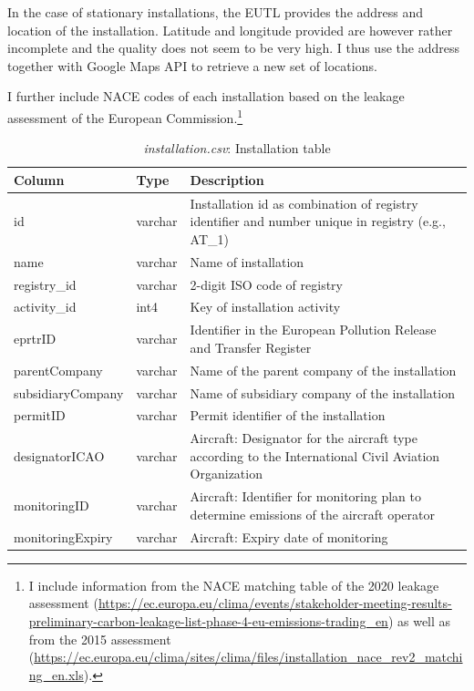 \documentclass[authoryear]{elsarticle}
\begin{document}
In the case of stationary installations, the EUTL provides the address and location of the installation. Latitude and longitude provided are however rather incomplete and the quality does not seem to be very high. I thus use the address together with Google Maps API to retrieve a new set of locations. 

I further include NACE codes of each installation based on the leakage assessment of the European Commission.\footnote{I include information from the NACE matching table of the 2020 leakage assessment (\url{https://ec.europa.eu/clima/events/stakeholder-meeting-results-preliminary-carbon-leakage-list-phase-4-eu-emissions-trading_en}) as well as from the 2015 assessment (\url{https://ec.europa.eu/clima/sites/clima/files/installation_nace_rev2_matching_en.xls}).}

\begin{table}[tbp]\scriptsize
	\caption{\textit{installation.csv}: Installation table}\label{tab:tbl_installation}
	\centering
	\begin{tabular*}{\textwidth}{@{}@{\extracolsep{\fill}} llp{8cm} @{}}
		\toprule
		\toprule
		\textbf{Column} & \textbf{Type}  & \textbf{Description} \\
		\midrule
		id    & varchar & Installation id as combination of registry identifier and number unique in registry (e.g., AT\_1) \\
		name  & varchar & Name of installation \\
		registry\_id & varchar & 2-digit ISO code of registry  \\
		activity\_id & int4  & Key of installation activity  \\
		eprtrID & varchar & Identifier in the European Pollution Release and Transfer Register \\
		parentCompany & varchar & Name of the parent company of the installation \\
		subsidiaryCompany & varchar & Name of subsidiary company of the installation \\
		permitID & varchar & Permit identifier of the installation \\
		designatorICAO & varchar & Aircraft: Designator for the aircraft type according to the International Civil Aviation Organization \\
		monitoringID & varchar & Aircraft: Identifier for monitoring plan to determine emissions of the aircraft operator \\
		monitoringExpiry & varchar & Aircraft: Expiry date of monitoring  \\

\end{tabular*}
\end{table}
\end{document}
